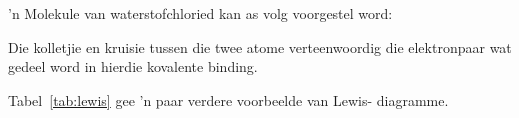 'n Molekule van waterstofchloried kan as volg voorgestel word:
\begin{center}
\end{center}

      \par 
      \label{m38701*id140178}Die kolletjie en kruisie tussen die twee atome verteenwoordig die elektronpaar wat gedeel word in hierdie kovalente binding.\par 
Tabel~\ref{tab:lewis} gee 'n paar verdere voorbeelde van Lewis- diagramme.
